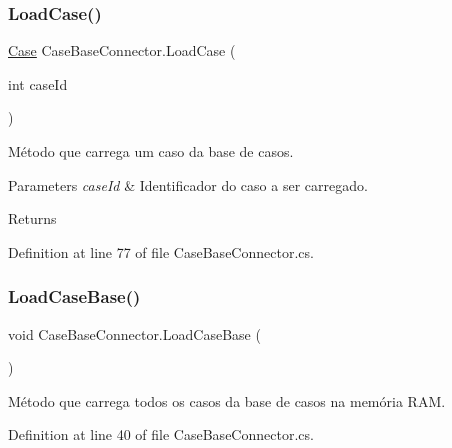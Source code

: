 \hypertarget{class_case_base_connector_abca3ec961411fce4948f4ea5b40e9fb6}{}\label{class_case_base_connector_abca3ec961411fce4948f4ea5b40e9fb6} 
\subsubsection{\texorpdfstring{Load\+Case()}{LoadCase()}}
{\footnotesize\ttfamily \hyperlink{class_case}{Case} Case\+Base\+Connector.\+Load\+Case (\begin{DoxyParamCaption}\item[{int}]{case\+Id }\end{DoxyParamCaption})}



Método que carrega um caso da base de casos. 


\begin{DoxyParams}{Parameters}
{\em case\+Id} & Identificador do caso a ser carregado.\\
\hline
\end{DoxyParams}
\begin{DoxyReturn}{Returns}

\end{DoxyReturn}


Definition at line 77 of file Case\+Base\+Connector.\+cs.

\hypertarget{class_case_base_connector_a6b5e35626b1b6a718bbdba83f153834b}{}\label{class_case_base_connector_a6b5e35626b1b6a718bbdba83f153834b} 
\subsubsection{\texorpdfstring{Load\+Case\+Base()}{LoadCaseBase()}}
{\footnotesize\ttfamily void Case\+Base\+Connector.\+Load\+Case\+Base (\begin{DoxyParamCaption}{ }\end{DoxyParamCaption})}



Método que carrega todos os casos da base de casos na memória R\+AM. 



Definition at line 40 of file Case\+Base\+Connector.\+cs.

